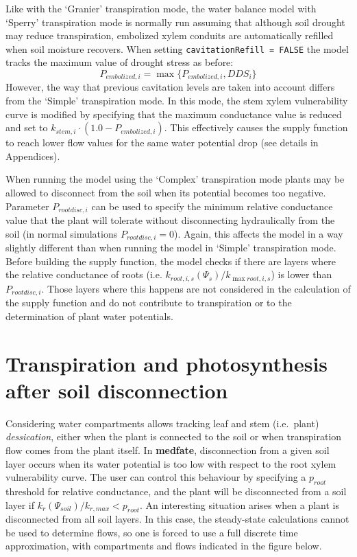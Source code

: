 \documentclass[]{book}
\begin{document}
Like with the `Granier' transpiration mode, the water balance model with `Sperry' transpiration mode is normally run assuming that although soil drought may reduce transpiration, embolized xylem conduits are automatically refilled when soil moisture recovers. When setting \texttt{cavitationRefill = FALSE} the model tracks the maximum value of drought stress as before:
\begin{equation}
P_{embolized,i}= \max \{P_{embolized,i}, DDS_i \}
\end{equation}
However, the way that previous cavitation levels are taken into account differs from the `Simple' transpiration mode. In this mode, the stem xylem vulnerability curve is modified by specifying that the maximum conductance value is reduced and set to \(k_{stem,i} \cdot (1.0 - P_{embolized,i})\). This effectively causes the supply function to reach lower flow values for the same water potential drop (see details in Appendices).

When running the model using the `Complex' transpiration mode plants may be allowed to disconnect from the soil when its potential becomes too negative. Parameter \(P_{rootdisc,i}\) can be used to specify the minimum relative conductance value that the plant will tolerate without disconnecting hydraulically from the soil (in normal simulations \(P_{rootdisc,i} = 0\)). Again, this affects the model in a way slightly different than when running the model in `Simple' transpiration mode. Before building the supply function, the model checks if there are layers where the relative conductance of roots (i.e. \(k_{root, i, s}(\Psi_{s})/k_{\max root, i, s}\)) is lower than \(P_{rootdisc,i}\). Those layers where this happens are not considered in the calculation of the supply function and do not contribute to transpiration or to the determination of plant water potentials.

\hypertarget{transpiration-and-photosynthesis-after-soil-disconnection}{%
\section{Transpiration and photosynthesis after soil disconnection}\label{transpiration-and-photosynthesis-after-soil-disconnection}}

Considering water compartments allows tracking leaf and stem (i.e.~plant) \emph{dessication}, either when the plant is connected to the soil or when transpiration flow comes from the plant itself. In \textbf{medfate}, disconnection from a given soil layer occurs when its water potential is too low with respect to the root xylem vulnerability curve. The user can control this behaviour by specifying a \(p_{root}\) threshold for relative conductance, and the plant will be disconnected from a soil layer if \(k_{r}(\Psi_{soil})/k_{r,max} < p_{root}\). An interesting situation arises when a plant is disconnected from all soil layers. In this case, the steady-state calculations cannot be used to determine flows, so one is forced to use a full discrete time approximation, with compartments and flows indicated in the figure below.
\end{document}
